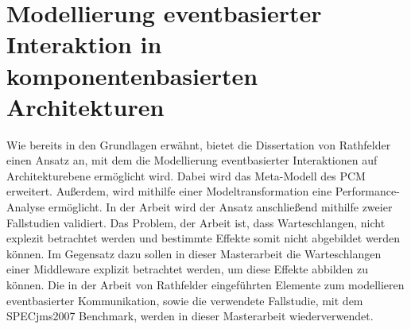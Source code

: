 \section{Modellierung eventbasierter Interaktion in komponentenbasierten Architekturen}
Wie bereits in den Grundlagen erwähnt, bietet die Dissertation von Rathfelder \cite{Rathfelder2013} einen Ansatz an, mit dem die Modellierung eventbasierter Interaktionen auf Architekturebene ermöglicht wird. Dabei wird das Meta-Modell des PCM erweitert. Außerdem, wird mithilfe einer Modeltransformation eine Performance-Analyse ermöglicht. In der Arbeit wird der Ansatz anschließend mithilfe zweier Fallstudien validiert. Das Problem, der Arbeit ist, dass Warteschlangen, nicht explezit betrachtet werden und bestimmte Effekte somit nicht abgebildet werden können. Im Gegensatz dazu sollen in dieser Masterarbeit die Warteschlangen einer Middleware explizit betrachtet werden, um diese Effekte abbilden zu können. Die in der Arbeit von Rathfelder eingeführten Elemente zum modellieren eventbasierter Kommunikation, sowie die verwendete Fallstudie, mit dem SPECjms2007 Benchmark, werden in dieser Masterarbeit wiederverwendet.
